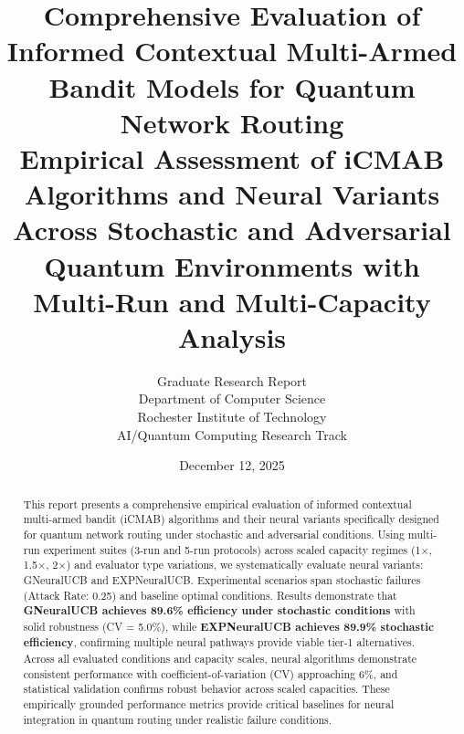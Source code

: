 \documentclass[12pt,a4paper]{article}
\title{\textbf{Comprehensive Evaluation of Informed Contextual Multi-Armed Bandit Models for Quantum Network Routing}\\
\large{Empirical Assessment of iCMAB Algorithms and Neural Variants Across Stochastic and Adversarial Quantum Environments with Multi-Run and Multi-Capacity Analysis}}
\author{Graduate Research Report\\
Department of Computer Science\\
Rochester Institute of Technology\\
AI/Quantum Computing Research Track}
\date{December 12, 2025}
\newcommand{\legacy}[1]{\textcolor{legacycolor}{\textbf{#1}}}
\newcommand{\neural}[1]{\textcolor{neuralcolor}{\textbf{#1}}}
\begin{document}
\maketitle

\begin{abstract}
This report presents a comprehensive empirical evaluation of informed contextual multi-armed bandit (iCMAB) algorithms and their neural variants specifically designed for quantum network routing under stochastic and adversarial conditions. Using multi-run experiment suites (3-run and 5-run protocols) across scaled capacity regimes (1$\times$, 1.5$\times$, 2$\times$) and evaluator type variations, we systematically evaluate neural variants: GNeuralUCB and EXPNeuralUCB. Experimental scenarios span stochastic failures (Attack Rate: 0.25) and baseline optimal conditions. Results demonstrate that \neural{GNeuralUCB achieves 89.6\% efficiency under stochastic conditions} with solid robustness (CV = 5.0\%), while \legacy{EXPNeuralUCB achieves 89.9\% stochastic efficiency}, confirming multiple neural pathways provide viable tier-1 alternatives. Across all evaluated conditions and capacity scales, neural algorithms demonstrate consistent performance with coefficient-of-variation (CV) approaching 6\%, and statistical validation confirms robust behavior across scaled capacities. These empirically grounded performance metrics provide critical baselines for neural integration in quantum routing under realistic failure conditions.
\end{abstract}

\newpage
\tableofcontents

\newpage
\end{document}
